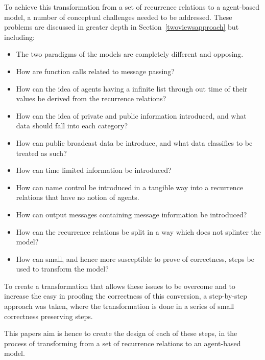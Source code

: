 \documentclass{article}
\begin{document}
To achieve this transformation from a set of recurrence relations to a agent-based model, a number of conceptual challenges needed to be addressed. These problems are discussed in greater depth in Section~\ref{twoviewsapproach} but including: 
\begin{itemize}
   \item The two paradigms of the models are completely different and opposing. 
   \item How are function calls related to message passing?
   \item How can the idea of agents having a infinite list through out time of their values be derived from the recurrence relations? 
   \item How can the idea of private and public information introduced, and what data should fall into each category? 
   \item How can public broadcast data be introduce, and what data classifies to be treated as such? 
   \item How can time limited information be introduced?
   \item How can name control be introduced in a tangible way into a recurrence relations that have no notion of agents. 
   \item How can output messages containing message information be introduced? 
   \item How can the recurrence relations be split in a way which does not splinter the model? 
   \item How can small, and hence more susceptible to prove of correctness, steps be used to transform the model? 
\end{itemize}
To create a transformation that allows these issues to be overcome and to increase the easy in proofing the correctness of this conversion, a step-by-step approach was taken, where the transformation is done in a series of small correctness preserving steps. 

This papers aim is hence to create the design of each of these steps, in the process of transforming from a set of recurrence relations to an agent-based model.
\end{document}
